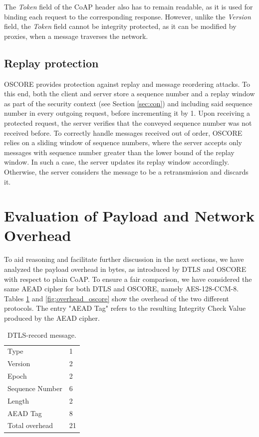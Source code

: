 {The \emph{Token} field of the CoAP header also has to remain readable, as it is used for binding each request to the corresponding response. However, unlike the \emph{Version} field, the \emph{Token} field cannot be integrity protected, as it can be modified by proxies, when a message traverses the network.

\subsection{Replay protection}
\label{sec:repl}
OSCORE provides protection against replay and message reordering attacks. To this end, both the client and server store a sequence number and a replay window as part of the security context (see Section \ref{sec:con}) and including said sequence number in every outgoing request, before incrementing it by 1. Upon receiving a protected request, the server verifies that the conveyed sequence number was not received before. To correctly handle messages received out of order, OSCORE relies on a sliding window of sequence numbers, where the server accepts only messages with sequence number greater than the lower bound of the replay window. In such a case, the server updates its replay window accordingly. Otherwise, the server considers the message to be a retransmission and discards it.

\section{Evaluation of Payload and Network Overhead}
\label{s:payloadoverhead}
To aid reasoning and facilitate further discussion in the next sections, we have analyzed the payload overhead in bytes, as introduced by DTLS and OSCORE with respect to plain CoAP. To ensure a fair comparison, we have considered the same AEAD cipher for both DTLS and OSCORE, namely AES-128-CCM-8. Tables \ref{fig:overhead_dtls} and \ref{fig:overhead_oscore} show the overhead of the two different protocols. The entry "AEAD Tag" refers to the resulting Integrity Check Value produced by the AEAD cipher.

\begin{table}
\caption*{Payload overhead for DTLS 1.2 and OSCORE messages (bytes).}
\parbox[t]{.44\linewidth}{
\caption{DTLS-record message.}
\label{fig:overhead_dtls}
\centering
\begin{tabular}{l|l}
Type    & 1  \\
Version & 2  \\
Epoch           & 2  \\
Sequence Number & 6  \\
Length          & 2  \\
AEAD Tag        & 8  \\ \hline
Total overhead           & 21
\end{tabular}

}
\end{table}}
